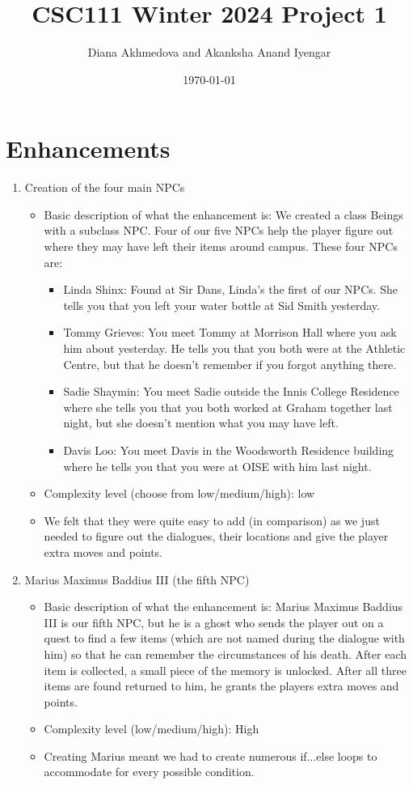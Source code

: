 \documentclass[11pt]{article}
\title{CSC111 Winter 2024 Project 1}
\author{Diana Akhmedova and Akanksha Anand Iyengar}
\date{\today}
\begin{document}
\maketitle

\section*{Enhancements}


\begin{enumerate}

\item Creation of the four main NPCs
	\begin{itemize}
	\item Basic description of what the enhancement is: We created a class Beings with a subclass NPC. Four of our five NPCs help the player figure out where they may have left their items around campus. These four NPCs are: 
            \begin{itemize}
                \item Linda Shinx: Found at Sir Dans, Linda's the first of our NPCs. She tells you that you left your water bottle at Sid Smith yesterday.
                \item Tommy Grieves: You meet Tommy at Morrison Hall where you ask him about yesterday. He tells you that you both were at the Athletic Centre, but that he doesn't remember if you forgot anything there.
                \item Sadie Shaymin: You meet Sadie outside the Innis College Residence where she tells you that you both worked at Graham together last night, but she doesn't mention what you may have left.
                \item Davis Loo: You meet Davis in the Woodsworth Residence building where he tells you that you were at OISE with him last night.
            \end{itemize}
	\item Complexity level (choose from low/medium/high): low
	\item We felt that they were quite easy to add (in comparison) as we just needed to figure out the dialogues, their locations and give the player extra moves and points.
	\end{itemize}
\item Marius Maximus Baddius III (the fifth NPC)
    \begin{itemize}
    \item Basic description of what the enhancement is: Marius Maximus Baddius III is our fifth NPC, but he is a ghost who sends the player out on a quest to find a few items (which are not named during the dialogue with him) so that he can remember the circumstances of his death. After each item is collected, a small piece of the memory is unlocked. After all three items are found returned to him, he grants the players extra moves and points.
    \item Complexity level (low/medium/high): High
    \item Creating Marius meant we had to create numerous if...else loops to accommodate for every possible condition.
    \end{itemize}


\end{enumerate}
\end{document}
